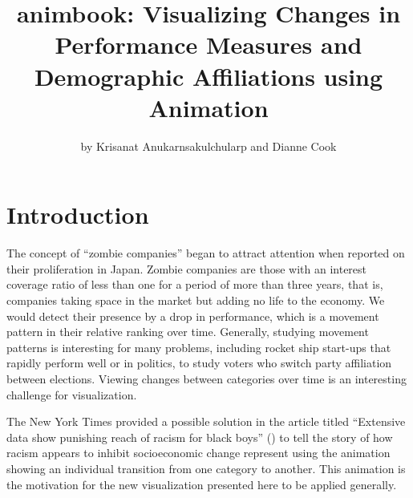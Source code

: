 \title{animbook: Visualizing Changes in Performance Measures and Demographic Affiliations using Animation}


\author{by Krisanat Anukarnsakulchularp and Dianne Cook}

\maketitle


\section{Introduction}\label{intro}

The concept of ``zombie companies'' began to attract attention when \citet{zombie_companies_2008} reported on their proliferation in Japan. Zombie companies are those with an interest coverage ratio of less than one for a period of more than three years, that is, companies taking space in the market but adding no life to the economy. We would detect their presence by a drop in performance, which is a movement pattern in their relative ranking over time. Generally, studying movement patterns is interesting for many problems, including rocket ship start-ups that rapidly perform well or in politics, to study voters who switch party affiliation between elections. Viewing changes between categories over time is an interesting challenge for visualization.

The New York Times provided a possible solution in the article titled ``Extensive data show punishing reach of racism for black boys'' (\citet{the_new_york_time}) to tell the story of how racism appears to inhibit socioeconomic change represent using the animation showing an individual transition from one category to another. This animation is the motivation for the new visualization presented here to be applied generally.

